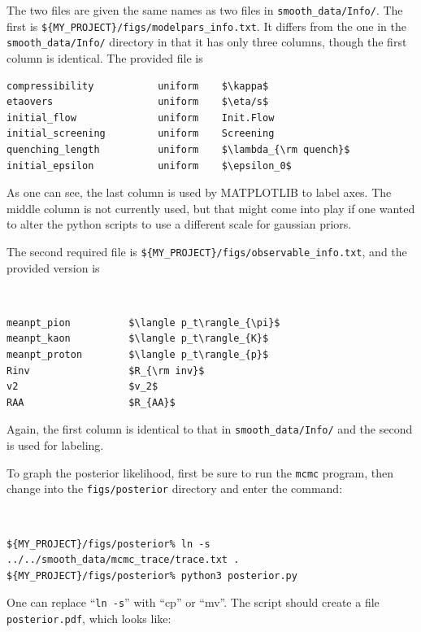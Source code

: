 \documentclass[UserManual.tex]{subfiles}
\begin{document}
The two files are given the same names as two files in {\tt smooth\_data/Info/}. The first is {\tt \$\{MY\_PROJECT\}/figs/modelpars\_info.txt}. It differs from the one in the {\tt smooth\_data/Info/} directory in that it has only three columns, though the first column is identical. The provided file is\\
{\tt\begin{verbatim}
compressibility           uniform    $\kappa$
etaovers                  uniform    $\eta/s$
initial_flow              uniform    Init.Flow
initial_screening         uniform    Screening
quenching_length          uniform    $\lambda_{\rm quench}$
initial_epsilon           uniform    $\epsilon_0$
\end{verbatim}}
As one can see, the last column is used by MATPLOTLIB to label axes. The middle column is not currently used, but that might come into play if one wanted to alter the python scripts to use a different scale for gaussian priors.

The second required file is {\tt \$\{MY\_PROJECT\}/figs/observable\_info.txt}, and the provided version is\\
{\tt
\begin{verbatim}
meanpt_pion          $\langle p_t\rangle_{\pi}$
meanpt_kaon          $\langle p_t\rangle_{K}$
meanpt_proton        $\langle p_t\rangle_{p}$
Rinv                 $R_{\rm inv}$
v2                   $v_2$
RAA                  $R_{AA}$
\end{verbatim}}
Again, the first column is identical to that in {\tt smooth\_data/Info/} and the second is used for labeling.

To graph the posterior likelihood, first be sure to run the {\tt mcmc} program, then change into the {\tt figs/posterior} directory and enter the command:
{\tt
\begin{verbatim}
${MY_PROJECT}/figs/posterior% ln -s ../../smooth_data/mcmc_trace/trace.txt .
${MY_PROJECT}/figs/posterior% python3 posterior.py
\end{verbatim}}
One can replace ``{\tt ln -s}'' with ``cp'' or ``mv''. The script should create a file {\tt posterior.pdf}, which looks like:
\end{document}
